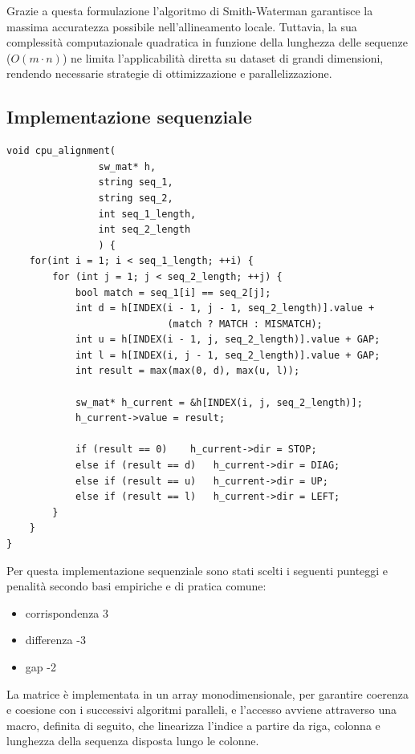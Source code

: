 \documentclass[a4paper,12pt]{article}
\begin{document}
Grazie a questa formulazione l'algoritmo di Smith-Waterman garantisce la massima accuratezza possibile nell'allineamento locale.
Tuttavia, la sua complessità computazionale quadratica in funzione della lunghezza delle sequenze ($O(m \cdot n)$) ne limita l'applicabilità diretta su dataset di grandi dimensioni, rendendo necessarie strategie di ottimizzazione e parallelizzazione.

\subsection{Implementazione sequenziale}
\begin{lstlisting}
void cpu_alignment(
                sw_mat* h,
                string seq_1,
                string seq_2,
                int seq_1_length,
                int seq_2_length
                ) {
    for(int i = 1; i < seq_1_length; ++i) {
        for (int j = 1; j < seq_2_length; ++j) {
            bool match = seq_1[i] == seq_2[j];
            int d = h[INDEX(i - 1, j - 1, seq_2_length)].value +
                            (match ? MATCH : MISMATCH);
            int u = h[INDEX(i - 1, j, seq_2_length)].value + GAP;
            int l = h[INDEX(i, j - 1, seq_2_length)].value + GAP;
            int result = max(max(0, d), max(u, l));
            
            sw_mat* h_current = &h[INDEX(i, j, seq_2_length)];
            h_current->value = result;

            if (result == 0)    h_current->dir = STOP;
            else if (result == d)   h_current->dir = DIAG;
            else if (result == u)   h_current->dir = UP;
            else if (result == l)   h_current->dir = LEFT;
        }
    }
}
\end{lstlisting}

Per questa implementazione sequenziale sono stati scelti i seguenti punteggi e penalità secondo basi empiriche e di pratica comune:
\begin{itemize}
    \item corrispondenza 3
    \item differenza -3
    \item gap -2
\end{itemize}

La matrice è implementata in un array monodimensionale, per garantire coerenza e coesione con i successivi algoritmi paralleli, e l'accesso avviene attraverso una macro, definita di seguito, che linearizza l'indice a partire da riga, colonna e lunghezza della sequenza disposta lungo le colonne.
\end{document}
